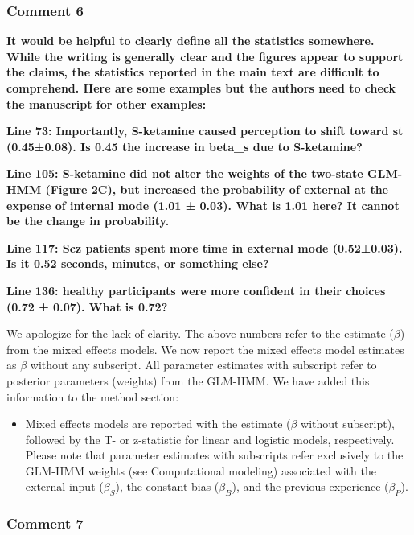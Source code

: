 \documentclass[
]{article}
\providecommand{\tightlist}{%
  \setlength{\itemsep}{0pt}\setlength{\parskip}{0pt}}
\begin{document}
\subsubsection{Comment 6}\label{comment-6-2}

\textbf{It would be helpful to clearly define all the statistics
somewhere. While the writing is generally clear and the figures appear
to support the claims, the statistics reported in the main text are
difficult to comprehend. Here are some examples but the authors need to
check the manuscript for other examples:}

\textbf{Line 73: Importantly, S-ketamine caused perception to shift
toward st (0.45±0.08). Is 0.45 the increase in beta\_s due to
S-ketamine?}

\textbf{Line 105: S-ketamine did not alter the weights of the two-state
GLM-HMM (Figure 2C), but increased the probability of external at the
expense of internal mode (1.01 ± 0.03). What is 1.01 here? It cannot be
the change in probability.}

\textbf{Line 117: Scz patients spent more time in external mode
(0.52±0.03). Is it 0.52 seconds, minutes, or something else?}

\textbf{Line 136: healthy participants were more confident in their
choices (0.72 ± 0.07). What is 0.72?}

We apologize for the lack of clarity. The above numbers refer to the
estimate (\(\beta\)) from the mixed effects models. We now report the
mixed effects model estimates as \(\beta\) without any subscript. All
parameter estimates with subscript refer to posterior parameters
(weights) from the GLM-HMM. We have added this information to the method
section:

\begin{itemize}
\tightlist
\item
  Mixed effects models are reported with the estimate (\(\beta\) without
  subscript), followed by the T- or z-statistic for linear and logistic
  models, respectively. Please note that parameter estimates with
  subscripts refer exclusively to the GLM-HMM weights (see Computational
  modeling) associated with the external input (\(\beta_S\)), the
  constant bias (\(\beta_B\)), and the previous experience
  (\(\beta_P\)).
\end{itemize}

\subsubsection{Comment 7}\label{comment-7}
\end{document}
